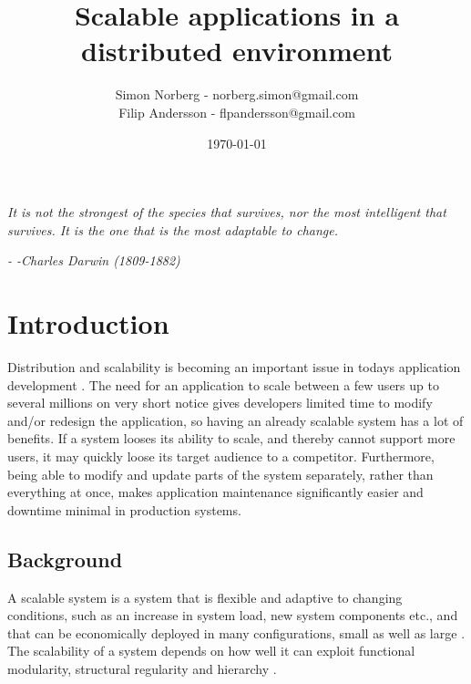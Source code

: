 \documentclass{article}
\begin{document}

\title{Scalable applications in a distributed environment}
\author{Simon Norberg - norberg.simon@gmail.com\\
        Filip Andersson - flpandersson@gmail.com }
\date{\today}
\maketitle

\newpage
\noindent\large{\emph{It is not the strongest of the species that survives, nor the most 
intelligent that survives. It is the one that is the most adaptable to change.}
\begin{flushright}
\emph{- -Charles Darwin (1809-1882)}
\end{flushright}
\newpage
 
 
\section{Introduction}

Distribution and scalability is becoming an important issue in todays
application development \cite{rellermeyer2007services}.
The need for an application to scale between a few users up to several millions 
on very short notice gives developers limited time to modify and/or redesign 
the application, so having an already scalable system has a lot of benefits. 
If a system looses its ability to scale, and thereby cannot support more users, 
it may quickly loose its target audience to a competitor. Furthermore, being able 
to modify and update parts of the system separately, rather than everything at 
once, makes application maintenance significantly easier and downtime minimal 
in production systems.

\subsection{Background}

A scalable system is a system that is flexible and adaptive to changing
conditions, such as an increase in system load, new system components etc., and
that can be economically deployed in many configurations, small as well as
large \cite{jogalekar2000evaluating}. The scalability of a system depends on
how well it can exploit functional modularity, structural regularity and
hierarchy \cite{lipson2007principles}.

}
\end{document}

